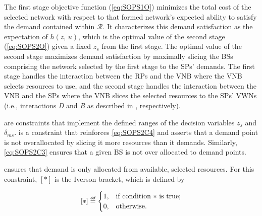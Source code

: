 \documentclass[12pt,dvipsnames]{report}
\newif\ifisdoublespacing
\newcommand\defeq{\mathrel{\overset{\makebox[0pt]{\mbox{\normalfont\tiny\sffamily def}}}{=}}}
\begin{document}
The first stage objective function (\cref{eq:SOPS1O}) minimizes the total cost of the selected network with respect to that formed network's expected ability to satisfy the demand contained within $\mathcal{R}$.  It characterizes this demand satisfaction as the expectation of $h\left( z,\, u \right)$, which is the optimal value of the second stage (\cref{eq:SOPS2O}) given a fixed $z_s$ from the first stage.  The optimal value of the second stage maximizes demand satisfaction by maximally slicing the BSs comprising the network selected by the first stage to the SPs' demands.  The first stage handles the interaction between the RPs and the VNB where the VNB selects resources to use, and the second stage handles the interaction between the VNB and the SPs where the VNB slices the selected resources to the SPs' VWNs (i.e., interactions \emph{D} and \emph{B} as described in , respectively).

 are constraints that implement the defined ranges of the decision variables $z_s$ and $\delta_{ms}$.   is a constraint that reinforces \cref{eq:SOPS2C4} and asserts that a demand point is not overallocated by slicing it more resources than it demands.  Similarly, \cref{eq:SOPS2C3} ensures that a given BS is not over allocated to demand points.

 ensures that demand is only allocated from available, selected resources.  For this constraint, $\left[ * \right]$ is the Iverson bracket, which is defined by

\ifisdoublespacing
\begin{singlespacing}
\begin{equation} \label{eq:iverson}
\left[ * \right] \defeq
	\begin{cases}
		1,& \text{if condition $*$ is true;}\\
		\\
		0,& \text{otherwise}.
	\end{cases}
\end{equation}
\end{singlespacing}
\else
\begin{equation} \label{eq:iverson}
\left[ * \right] \defeq
	\begin{cases}
		1,& \text{if condition $*$ is true;}\\
		0,& \text{otherwise}.
	\end{cases}
\end{equation}
\fi
\end{document}
